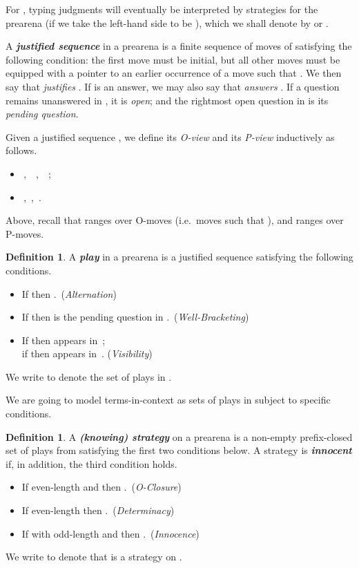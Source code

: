 \documentclass{CSML}
\theoremstyle{definition}\newtheorem{definition}[thm]{Definition}
\theoremstyle{definition}\newtheorem{example}[thm]{Example}
\theoremstyle{definition}\newtheorem{proposition}[thm]{Proposition}
\theoremstyle{definition}\newtheorem{lemma}[thm]{Lemma}
\theoremstyle{definition}\newtheorem{theorem}[thm]{Theorem}
\theoremstyle{definition}\newtheorem{corollary}[thm]{Corollary}
\theoremstyle{definition}\newtheorem{remark}[thm]{Remark}
\newcommand\nt[1]{#1}
\newcommand\boldemph[1]{\emph{\textbf{#1}}}
\begin{document}
For , typing judgments  will eventually be interpreted by strategies for the prearena
 (if  we take the left-hand side to be ),
which we shall denote by  or .

A \boldemph{justified sequence} in a prearena  is a finite sequence 
of moves of  satisfying the following condition: the first move must be initial,
but all other moves  must be equipped with a pointer  to an earlier
occurrence of a move  such that .
\nt{We then say that  \emph{justifies} . If  is an answer, we may also say that  \emph{answers} .
If a question remains unanswered in , it is \emph{open}; and the rightmost open question in  is its \emph{pending question}.}

Given a justified sequence , we define its \emph{O-view } and its \emph{P-view}  inductively as follows.
\begin{itemize}
\item \,, \,
\,, \,
\,;
\item
\,,
\,,
\,.
\end{itemize}
Above, \nt{recall that}  ranges over O-moves (i.e.\ moves  such that ), and  ranges over P-moves.

\begin{definition}
A \boldemph{play} in a prearena  is a justified sequence  satisfying
the following conditions.
\begin{itemize}
\item If  then .\ (\emph{Alternation})
\item If  then  is the pending question in .\
(\emph{Well-Bracketing})
\item
If  then  appears in \,;\\ 
if   then  appears in \,.
(\emph{Visibility})
\end{itemize}
We write  to denote the set of plays in .
\end{definition}



We are going to model terms-in-context  as sets of plays in  subject to specific conditions.

\begin{definition}
A \boldemph{(knowing) strategy}  on a prearena  is a {non-empty} prefix-closed set of plays from  satisfying the first two conditions below. A strategy is \boldemph{innocent} if, in addition, the third condition holds.
\begin{itemize}
\item If even-length  and  then .\
(\emph{O-Closure})
 \item If even-length  then .\ (\emph{Determinacy})
 \item If  with odd-length  and  then .\ (\emph{Innocence})
\end{itemize}
We write  to denote that  is a strategy on .
\end{definition}
\end{document}
